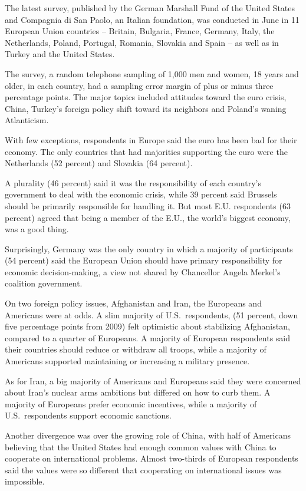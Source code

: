 ﻿\documentclass[12pt]{article}
\begin{document}
The latest survey, published by the German Marshall Fund of the United States and Compagnia di San
Paolo, an Italian foundation, was conducted in June in 11 European Union countries -- Britain,
Bulgaria, France, Germany, Italy, the Netherlands, Poland, Portugal, Romania, Slovakia and Spain --
as well as in Turkey and the United States.

The survey, a random telephone sampling of 1,000 men and women, 18 years and older, in each country,
had a sampling error margin of plus or minus three percentage points. The major topics included
attitudes toward the euro crisis, China, Turkey's foreign policy shift toward its neighbors and
Poland's waning Atlanticism.

With few exceptions, respondents in Europe said the euro has been bad for their economy. The only
countries that had majorities supporting the euro were the Netherlands (52 percent) and Slovakia (64
percent).

A plurality (46 percent) said it was the responsibility of each country's government to deal with
the economic crisis, while 39 percent said Brussels should be primarily responsible for handling it.
But most E.U. respondents (63 percent) agreed that being a member of the E.U., the world's biggest
economy, was a good thing.

Surprisingly, Germany was the only country in which a majority of participants (54 percent) said the
European Union should have primary responsibility for economic decision-making, a view not shared by
Chancellor Angela Merkel's coalition government.

On two foreign policy issues, Afghanistan and Iran, the Europeans and Americans were at odds. A slim
majority of U.S.~respondents, (51 percent, down five percentage points from 2009) felt optimistic
about stabilizing Afghanistan, compared to a quarter of Europeans. A majority of European
respondents said their countries should reduce or withdraw all troops, while a majority of Americans
supported maintaining or increasing a military presence.

As for Iran, a big majority of Americans and Europeans said they were concerned about Iran's nuclear
arms ambitions but differed on how to curb them. A majority of Europeans prefer economic incentives,
while a majority of U.S.~respondents support economic sanctions.

Another divergence was over the growing role of China, with half of Americans believing that the
United States had enough common values with China to cooperate on international problems. Almost
two-thirds of European respondents said the values were so different that cooperating on
international issues was impossible.
\end{document}
